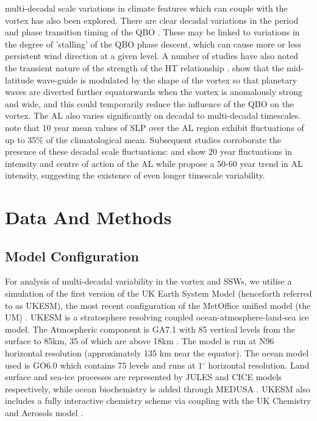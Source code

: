multi-decadal scale variations in climate features which can couple with the vortex has also been explored. There are clear decadal variations in the period and phase transition timing of the QBO \citep{pascoeQuasibiennial2005,Anstey2008,Yang2016}. These may be linked to variations in the degree of 'stalling' of the QBO phase descent, which can cause more or less persistent wind direction at a given level.  A number of studies have also noted the transient nature of the strength of the HT relationship \citep{luDecadalscale2008,luMechanisms2014,Anstey2008,ospreyClimatology2010}. \cite{luDecadalscale2008,luMechanisms2014} show that the mid-latitude wave-guide is modulated by the shape of the vortex so that planetary waves are diverted further equatorwards when the vortex is anomalously strong and wide, and this could temporarily reduce the influence of the QBO on the vortex. The AL also varies significantly on decadal to multi-decadal timescales. \cite{Overland1999} note that 10 year mean values of SLP over the AL region exhibit fluctuations of up to 35\% of the climatological mean. Subsequent studies corroborate the presence of these decadal scale fluctuations: \cite{SUGIMOTO2009} and \cite{Minobe} show 20 year fluctuations in intensity and centre of action of the AL while \cite{Raible2005} propose a 50-60 year trend in AL intensity, suggesting the existence of even longer timescale variability. 

\section{Data And Methods}
\subsection{Model Configuration}
\label{sec:model_config}
For analysis of multi-decadal variability in the vortex and SSWs, we utilise a simulation of the first version of the UK Earth System Model (henceforth referred to as UKESM), the most recent configuration of the MetOffice unified model (the UM) \citep{Mulcahy2018}. UKESM is a stratosphere resolving coupled ocean-atmosphere-land-sea ice model. The Atmospheric component is GA7.1 with 85 vertical levels from the surface to 85km, 35 of which are above 18km \citep{Walters2019, Williams2018}. The model is run at N96 horizontal resolution (approximately 135 km near the equator). The ocean model used is GO6.0 \citep{Storkey2018} which contains 75 levels and runs at 1${^\circ}$ horizontal resolution. Land surface and sea-ice processes are represented by JULES \citep[GL7.0,][]{Walters2019} and CICE  \cite[GSI8.1,][]{Ridley2018} models respectively, while ocean biochemistry is added through MEDUSA \citep{Yool2013}. UKESM also includes a fully interactive chemistry scheme via coupling with the UK Chemistry and Aerosols model \citep[UKCA,][]{Mulcahy2018}.

